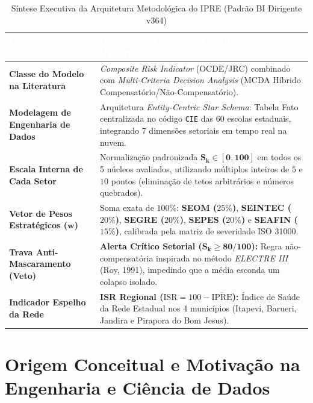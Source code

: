 \documentclass[9pt,a4paper]{extarticle}
\begin{document}
\begin{table}[htbp]
\centering
\small
\renewcommand{\arraystretch}{1.24}
\caption{Síntese Executiva da Arquitetura Metodológica do IPRE (Padrão BI Dirigente v364)}
\begin{tabularx}{\textwidth}{>{\bfseries\color{ureNavy}}p{4.3cm} X}
\toprule
\rowcolor{ureNavy} \textcolor{white}{Dimensão Arquitetural} & \textcolor{white}{\textbf{Especificação Técnica e Científica Adotada na URE Itapevi}} \\
\midrule
Classe do Modelo na Literatura & \emph{Composite Risk Indicator} (OCDE/JRC) combinado com \emph{Multi-Criteria Decision Analysis} (MCDA Híbrido Compensatório/Não-Compensatório). \\
\rowcolor{ureLight} Modelagem de Engenharia de Dados & Arquitetura \emph{Entity-Centric Star Schema}: Tabela Fato centralizada no código \texttt{CIE} das 60 escolas estaduais, integrando 7 dimensões setoriais em tempo real na nuvem. \\
Escala Interna de Cada Setor & Normalização padronizada $\mathbf{S_k \in [0, 100]}$ em todos os 5 núcleos avaliados, utilizando múltiplos inteiros de $5$ e $10$ pontos (eliminação de tetos arbitrários e números quebrados). \\
\rowcolor{ureLight} Vetor de Pesos Estratégicos ($\mathbf{w}$) & Soma exata de $100\%$: \textbf{SEOM ($25\%$)}, \textbf{SEINTEC ($20\%$)}, \textbf{SEGRE ($20\%$)}, \textbf{SEPES ($20\%$)} e \textbf{SEAFIN ($15\%$)}, calibrada pela matriz de severidade ISO 31000. \\
Trava Anti-Mascaramento (Veto) & \textbf{Alerta Crítico Setorial ($\mathbf{S_k \ge 80/100}$):} Regra não-compensatória inspirada no método \emph{ELECTRE III} (Roy, 1991), impedindo que a média esconda um colapso isolado. \\
\rowcolor{ureLight} Indicador Espelho da Rede & \textbf{ISR Regional ($\text{ISR} = 100 - \overline{\text{IPRE}}$):} Índice de Saúde da Rede Estadual nos 4 municípios (Itapevi, Barueri, Jandira e Pirapora do Bom Jesus). \\
\bottomrule
\end{tabularx}
\end{table}

\section{Origem Conceitual e Motivação na Engenharia e Ciência de Dados}
\end{document}
